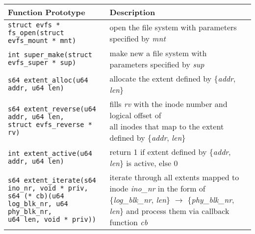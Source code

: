 \begin{table*}
\begin{center}
\begin{small}
\begin{tabular}[t]{|l|l|}
\hline 
\textbf{Function Prototype} & \textbf{Description} \\
\hline
\hline
\texttt{struct evfs * fs\_open(struct evfs\_mount * mnt)} & open the file system with parameters specified by \textit{mnt} \\
\hline
\hline
\texttt{int super\_make(struct evfs\_super * sup)} & make new a file system with parameters specified by \textit{sup} \\
\hline
\hline 
\texttt{s64 extent\_alloc(u64 addr, u64 len)} & allocate the extent defined by \{\textit{addr}, \textit{len}\} \\
\hline 
\makecell[l]{\texttt{s64 extent\_reverse(u64 addr, u64 len,} \\
\hspace{1em}\texttt{struct evfs\_reverse * rv)}} & \makecell[l]{fills \textit{rv} with the inode number and logical offset of \\ all inodes that map to the extent defined by \{\textit{addr}, \textit{len}\}} \\
\hline 
\texttt{int extent\_active(u64 addr, u64 len)} & return 1 if extent defined by \{\textit{addr}, \textit{len}\} is active, else 0 \\
\hline 
\makecell[l]{\texttt{s64 extent\_iterate(s64 ino\_nr, void * priv,} \\ 
\hspace{1em}\texttt{s64 (* cb)(u64 log\_blk\_nr, u64 phy\_blk\_nr,} \\
\hspace{6.25em}\texttt{u64 len, void * priv))}} & \makecell[l]{iterate through all extents mapped to inode \textit{ino\_nr} in \\ the form of \{\textit{log\_blk\_nr}, \textit{len}\} $\rightarrow$ \{\textit{phy\_blk\_nr}, \textit{len}\} \\ and process them via callback function \textit{cb}} \\

\end{tabular}
\end{small}
\end{center}
\end{table*}
